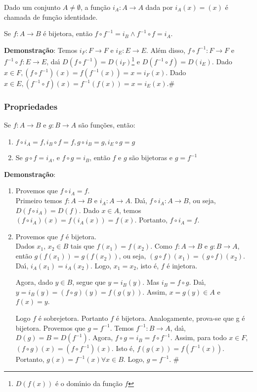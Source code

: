 \begin{definicao}
	Dado um conjunto $A\neq\emptyset$, a fun{\c c}{\~a}o $i_{A}: A \to A$ dada por $i_{A}(x)=(x)$ {\'e} chamada de fun{\c c}{\~a}o identidade.
\end{definicao}

\begin{proposicao}
Se $f:A \to B$ {\'e} bijetora, ent{\~a}o $f\circ f^{-1}=i_{B}\wedge f^{-1}\circ f=i_{A}$.
\end{proposicao}

\textbf{Demonstra{\c c}{\~a}o}: Temos $i_{F}:F \to F$ e $i_{E}:E \to E$. Al{\'e}m disso, $f\circ f^{-1}:F \to F$ e $f^{-1}\circ f:E \to E$, da{\'\i} $D(f\circ f^{-1})=D(i_{F})$\footnote{$D(f(x))$ {\'e} o dom{\'\i}nio da fun{\c c}{\~a}o $f$} e $D(f^{-1}\circ f)=D(i_{E})$. Dado $x\in F, (f\circ f^{-1})(x)=f(f^{-1}(x))=x=i_{F}(x)$. Dado $x\in E, (f^{-1}\circ f)(x)=f^{-1}(f(x))=x=i_{E}(x)$.\#

\subsubsection{Propriedades}
\begin{proposicao} Se $f:A \to B$ e $g:B \to A$ s{\~a}o fun{\c c}{\~o}es, ent{\~a}o:
\begin{enumerate}
\item $f\circ i_{A}=f, i_{B}\circ f=f, g\circ i_{B}=g, i_{E}\circ g=g$
\item Se $g\circ f=i_{A}$, e $f\circ g=i_{B}$, ent{\~a}o $f$ e $g$ s{\~a}o bijetoras e $g=f^{-1}$
\end{enumerate}
\end{proposicao}

\textbf{Demonstra{\c c}{\~a}o}:
\begin{enumerate}
\item Provemos que $f\circ i_{A}=f$.\\
Primeiro temos $f:A \to B$ e $i_{A}:A \to A$. Da{\'\i}, $f\circ i_{A}:A \to B$, ou seja, $D(f\circ i_{A})=D(f)$. Dado $x\in A$, temos $(f\circ i_{A})(x)=f(i_{A}(x))=f(x)$. Portanto, $f\circ i_{A}=f$.
\item Provemos que $f$ {\'e} bijetora.\\
Dados $x_{1}$, $x_{2}\in B$ tais que $f(x_{1})=f(x_{2})$. Como $f:A \to B$ e $g:B \to A$, ent{\~a}o $g(f(x_{1}))=g(f(x_{2}))$, ou seja, $(g\circ f)(x_{1})=(g\circ f)(x_{2})$. Da{\'\i}, $i_{A}(x_{1})=i_{A}(x_{2})$. Logo, $x_{1}=x_{2}$, isto {\'e}, $f$ {\'e} injetora.

Agora, dado $y\in B$, segue que $y=i_{B}(y)$. Mas $i_{B}=f\circ g$. Da{\'\i}, $y=i_{B}(y)=(f\circ g)(y)=f(g(y))$. Assim, $x=g(y)\in A$ e $f(x)=y$.

Logo $f$ {\'e} sobrejetora. Portanto $f$ {\'e} bijetora. Analogamente, prova-se que g {\'e} bijetora. Provemos que $g=f^{-1}$. Temos  $f^{-1}:B \to A$, da{\'\i}, $D(g) = B = D(f^{-1})$. Agora, $f\circ g = i_{B} = f\circ f^{-1}$. Assim, para todo $x\in F$, $(f\circ g)(x)=(f\circ f^{-1})(x)$. Isto {\'e}, $f(g(x))=f(f^{-1}(x))$. Portanto, $g(x)=f^{-1}(x)\forall x\in B$. Logo, $g=f^{-1}$. \#
\end{enumerate}

